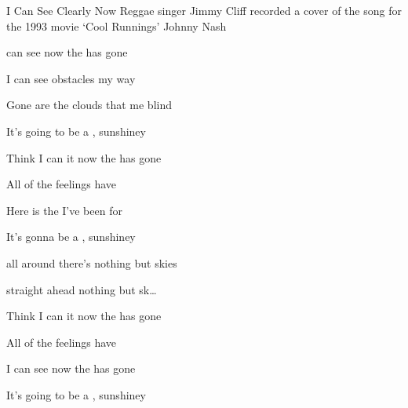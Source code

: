\begin{SBSong}{I Can See Clearly Now}
  {Reggae singer Jimmy Cliff recorded a cover of the song for the 1993 movie `Cool Runnings'}
  {Johnny Nash}
  \begin{SBVerse}
     can see  now the  has gone 

    I can see  obstacles  my way 

    Gone are the  clouds that  me blind 

    It's going to be a ,  sunshiney 
  \end{SBVerse}
  \begin{SBVerse}
     Think I can  it now the  has gone 

    All of the  feelings have 

    Here is the  I've been  for 

    It's gonna be a ,  sunshiney 
  \end{SBVerse}
  \begin{SBVerse}
     all around there's nothing but  skies 

     straight ahead nothing but  sk\ldots{}
  \end{SBVerse}
  \begin{SBVerse}
     Think I can  it now the  has gone 

    All of the  feelings have  

    I can see  now the  has gone 

    It's going to be a ,  sunshiney 
  \end{SBVerse}
  
\end{SBSong}
